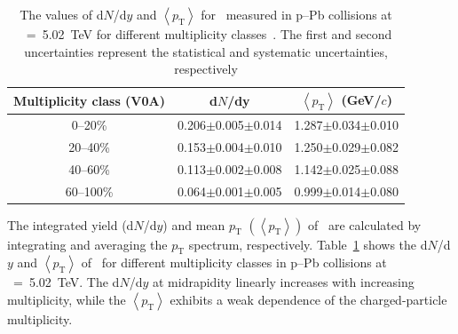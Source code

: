 \begin{table}[h!]
\caption{The values of d$N$/d$y$ and $\left\langle p_{\mathrm{T}} \right\rangle$ for \fzero~measured in p--Pb collisions at \snn~=~5.02~TeV for different multiplicity classes~\cite{ALICE:2012xs}. The first and second uncertainties represent the statistical and systematic uncertainties, respectively}
\centering
\begin{tabular}{ccc}
\hline 
Multiplicity class (V0A) & d$N$/dy & $\left\langle p_{\mathrm{T}} \right\rangle$ (GeV/$c$) \\ \hline
0--20\% & 0.206$\pm$0.005$\pm$0.014 & 1.287$\pm$0.034$\pm$0.010 \\
20--40\% & 0.153$\pm$0.004$\pm$0.010 & 1.250$\pm$0.029$\pm$0.082 \\
40--60\% & 0.113$\pm$0.002$\pm$0.008 & 1.142$\pm$0.025$\pm$0.088 \\
60--100\% & 0.064$\pm$0.001$\pm$0.005 & 0.999$\pm$0.014$\pm$0.080 \\
\hline
\end{tabular}
\label{tab:ymp}
\end{table}

The integrated yield (d$N$/d$y$) and mean $p_{\mathrm{T}}$ $\left( \left\langle p_{\mathrm{T}} \right\rangle \right)$ of \fzero~are calculated by integrating and averaging the $p_{\mathrm{T}}$ spectrum, respectively. Table~\ref{tab:ymp} shows the d$N$/d$y$ and $ \left\langle p_{\mathrm{T}} \right\rangle$ of \fzero~for different multiplicity classes in p--Pb collisions at \snn~=~5.02~TeV. The d$N$/d$y$ at midrapidity linearly increases with increasing multiplicity, while the $\left\langle p_{\mathrm{T}} \right\rangle$ exhibits a weak dependence of the charged-particle multiplicity. 

